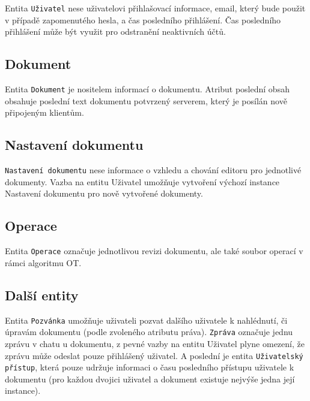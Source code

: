 Entita \texttt{Uživatel} nese uživatelovi přihlašovací informace, email, který bude použit v případě zapomenutého hesla, a čas posledního přihlášení.
Čas posledního přihlášení může být využit pro odstranění neaktivních účtů.

\subsection{Dokument}\label{subsec:dokument}

Entita \texttt{Dokument} je nositelem informací o dokumentu.
Atribut poslední obsah obsahuje poslední text dokumentu potvrzený serverem, který je posílán nově připojeným klientům.

\subsection{Nastavení dokumentu}\label{subsec:nastaveníDokumentu}

\texttt{Nastavení dokumentu} nese informace o vzhledu a chování editoru pro jednotlivé dokumenty.
Vazba na entitu Uživatel umožňuje vytvoření výchozí instance Nastavení dokumentu pro nově vytvořené dokumenty.

\subsection{Operace}\label{subsec:operace}

Entita \texttt{Operace} označuje jednotlivou revizi dokumentu, ale také soubor operací v rámci algoritmu \gls{OT}.

\subsection{Další entity}\label{subsec:dalšíEntity}

Entita \texttt{Pozvánka} umožňuje uživateli pozvat dalšího uživatele k nahlédnutí, či úpravám dokumentu (podle zvoleného atributu práva).
\texttt{Zpráva} označuje jednu zprávu v chatu u dokumentu, z pevné vazby na entitu Uživatel plyne omezení, že zprávu může odeslat pouze přihlášený uživatel.
A poslední je entita \texttt{Uživatelský přístup}, která pouze udržuje informaci o času posledního přístupu uživatele k dokumentu (pro každou dvojici uživatel a dokument existuje nejvýše jedna její instance).
